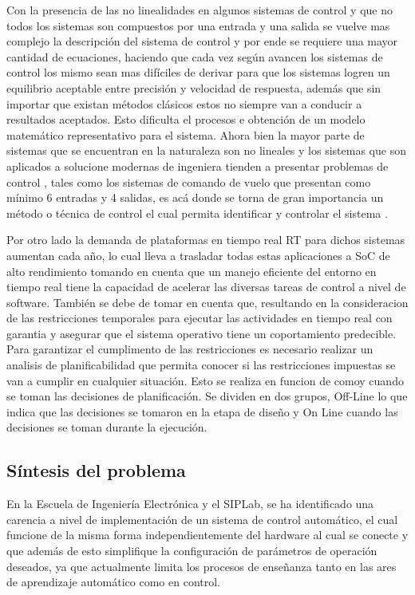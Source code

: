 \documentclass[12pt]{article}
\begin{document}
Con la presencia de las no linealidades en algunos sistemas de control y que no todos los sistemas son compuestos por una entrada y una salida se vuelve mas complejo la descripción del sistema  de control y por ende se requiere una mayor cantidad de ecuaciones, haciendo que cada vez según avancen los sistemas de control los mismo sean mas difíciles de derivar para que los sistemas logren un equilibrio aceptable entre precisión y velocidad de respuesta, además que sin importar que existan métodos clásicos estos no siempre van a conducir a resultados aceptados. Esto dificulta el procesos e obtención de un modelo matemático representativo para el sistema. Ahora bien la mayor parte de sistemas que se encuentran en la naturaleza son no lineales y los sistemas que son aplicados a solucione modernas de ingeniera tienden a presentar problemas de control , tales como los sistemas de comando de vuelo que presentan como mínimo 6 entradas y 4 salidas, es acá donde se torna de gran importancia un método o técnica de control el cual permita identificar y controlar el sistema \cite{15_tec}. 


Por otro lado la demanda de plataformas en tiempo real RT para dichos sistemas aumentan cada año, lo cual lleva a trasladar todas estas aplicaciones a SoC de alto rendimiento tomando en cuenta que un manejo eficiente del entorno en tiempo real tiene la capacidad de acelerar las diversas tareas de control a nivel de software. También se debe de tomar en cuenta que, resultando en la consideracion de las restricciones temporales para ejecutar las actividades en tiempo real con garantia y asegurar que el sistema operativo tiene un coportamiento predecible. Para garantizar el cumplimento de las restricciones es necesario realizar un analisis de planificabilidad que permita conocer si las restricciones impuestas se van a cumplir en cualquier situación. Esto se realiza en funcion de comoy cuando se toman las decisiones de planificación. Se dividen en dos grupos, Off-Line lo que indica que las decisiones se tomaron en la etapa de diseño y On Line cuando las decisiones se toman durante la ejecución.



\subsection{Síntesis del problema}

En la Escuela de Ingeniería Electrónica y el SIPLab, se ha identificado una carencia a nivel de implementación de un sistema de control automático, el cual funcione de la misma forma independientemente del  hardware al cual se conecte y que además de esto simplifique la configuración de parámetros de operación deseados, ya que actualmente limita los procesos de enseñanza tanto en las ares de aprendizaje automático como en control.
\end{document}
